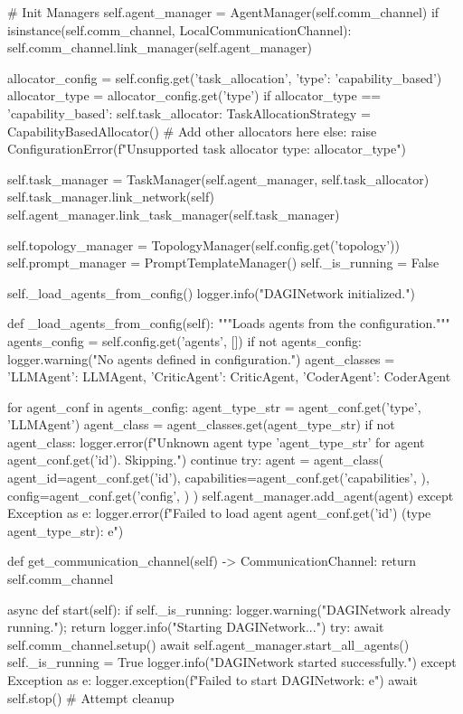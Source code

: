 \documentclass{amsbook}
\theoremstyle{definition}
\theoremstyle{remark}
\numberwithin{equation}{chapter} %
\begin{document}
\begin{python}
        # Init Managers
        self.agent_manager = AgentManager(self.comm_channel)
        if isinstance(self.comm_channel, LocalCommunicationChannel): self.comm_channel.link_manager(self.agent_manager)

        allocator_config = self.config.get('task_allocation', {'type': 'capability_based'})
        allocator_type = allocator_config.get('type')
        if allocator_type == 'capability_based': self.task_allocator: TaskAllocationStrategy = CapabilityBasedAllocator()
        # Add other allocators here
        else: raise ConfigurationError(f"Unsupported task allocator type: {allocator_type}")

        self.task_manager = TaskManager(self.agent_manager, self.task_allocator)
        self.task_manager.link_network(self)
        self.agent_manager.link_task_manager(self.task_manager)

        self.topology_manager = TopologyManager(self.config.get('topology'))
        self.prompt_manager = PromptTemplateManager()
        self._is_running = False

        self._load_agents_from_config()
        logger.info("DAGINetwork initialized.")

    def _load_agents_from_config(self):
        """Loads agents from the configuration."""
        agents_config = self.config.get('agents', [])
        if not agents_config: logger.warning("No agents defined in configuration.")
        agent_classes = {'LLMAgent': LLMAgent, 'CriticAgent': CriticAgent, 'CoderAgent': CoderAgent}

        for agent_conf in agents_config:
            agent_type_str = agent_conf.get('type', 'LLMAgent')
            agent_class = agent_classes.get(agent_type_str)
            if not agent_class:
                logger.error(f"Unknown agent type '{agent_type_str}' for agent {agent_conf.get('id')}. Skipping.")
                continue
            try:
                agent = agent_class(
                    agent_id=agent_conf.get('id'),
                    capabilities=agent_conf.get('capabilities', {}),
                    config=agent_conf.get('config', {})
                )
                self.agent_manager.add_agent(agent)
            except Exception as e:
                logger.error(f"Failed to load agent {agent_conf.get('id')} (type {agent_type_str}): {e}")


    def get_communication_channel(self) -> CommunicationChannel: return self.comm_channel

    async def start(self):
        if self._is_running: logger.warning("DAGINetwork already running."); return
        logger.info("Starting DAGINetwork...")
        try:
            await self.comm_channel.setup()
            await self.agent_manager.start_all_agents()
            self._is_running = True
            logger.info("DAGINetwork started successfully.")
        except Exception as e:
            logger.exception(f"Failed to start DAGINetwork: {e}")
            await self.stop() # Attempt cleanup


\end{python}
\end{document}
